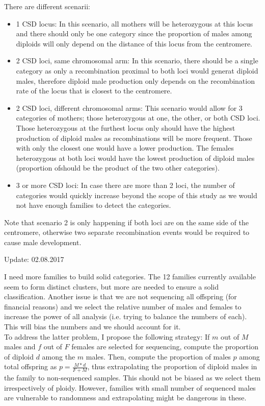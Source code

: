 \documentclass[10pt,a4paper]{report}
\begin{document}
There are different scenarii: 
\begin{itemize}
\item 1 CSD locus: In this scenario, all mothers will be heterozygous at this locus and there should only be one category since the proportion of males among diploids will only depend on the distance of this locus from the centromere.
\item 2 CSD loci, same chromosomal arm: In this scenario, there should be a single category as only a recombination proximal to both loci would generat diploid males, therefore diploid male production only depends on the recombination rate of the locus that is closest to the centromere.
\item 2 CSD loci, different chromosomal arms: This scenario would allow for 3 categories of mothers; those heterozygous at one, the other, or both CSD loci. Those heterozygous at the furthest locus only should have the highest production of diploid males as recombinations will be more frequent. Those with only the closest one would have a lower production. The females heterozygous at both loci would have the lowest production of diploid males (proportion ofshould be the product of the two other categories).
\item 3 or more CSD loci: In case there are more than 2 loci, the number of categories would quickly increase beyond the scope of this study as we would not have enough families to detect the categories.
\end{itemize}

Note that scenario 2 is only happening if both loci are on the same side of the centromere, otherwise two separate recombination events would be required to cause male development.

Update: 02.08.2017

I need more families to build solid categories. The 12 families currently available seem to form distinct clusters, but more are needed to ensure a solid classification. Another issue is that we are not sequencing all offspring (for financial reasons) and we select the relative number of males and females to increase the power of all analysis (i.e. trying to balance the numbers of each). This will bias the numbers and we should account for it.\\

To address the latter problem, I propose the following strategy: If $m$ out of $M$ males and $f$ out of $F$ females are selected for sequencing, compute the proportion of diploid $d$ among the $m$ males. Then, compute the proportion of males $p$ among total offspring as $p=\frac{M*d}{F+M}$, thus extrapolating the proportion of diploid males in the family to non-sequenced samples. This should not be biased as we select them irrespectively of ploidy. However, families with small number of sequenced males are vulnerable to randomness and extrapolating might be dangerous in these.
\end{document}
